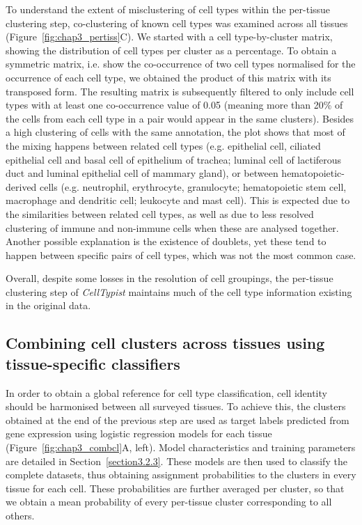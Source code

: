 To understand the extent of misclustering of cell types within the per-tissue clustering step, co-clustering of known cell types was examined across all tissues (Figure~\ref{fig:chap3_pertiss}C). We started with a cell type-by-cluster matrix, showing the distribution of cell types per cluster as a percentage. To obtain a symmetric matrix, i.e. show the co-occurrence of two cell types normalised for the occurrence of each cell type, we obtained the product of this matrix with its transposed form. The resulting matrix is subsequently filtered to only include cell types with at least one co-occurrence value of 0.05 (meaning more than 20\% of the cells from each cell type in a pair would appear in the same clusters). Besides a high clustering of cells with the same annotation, the plot shows that most of the mixing happens between related cell types (e.g. epithelial cell, ciliated epithelial cell and basal cell of epithelium of trachea; luminal cell of lactiferous duct and luminal epithelial cell of mammary gland), or between hematopoietic-derived cells (e.g. neutrophil, erythrocyte, granulocyte; hematopoietic stem cell, macrophage and dendritic cell; leukocyte and mast cell). This is expected due to the similarities between related cell types, as well as due to less resolved clustering of immune and non-immune cells when these are analysed together. Another possible explanation is the existence of doublets, yet these tend to happen between specific pairs of cell types, which was not the most common case.

Overall, despite some losses in the resolution of cell groupings, the per-tissue clustering step of \textit{CellTypist} maintains much of the cell type information existing in the original data.



\subsection{Combining cell clusters across tissues using tissue-specific classifiers}
\label{section3.2.2}
In order to obtain a global reference for cell type classification, cell identity should be harmonised between all surveyed tissues. To achieve this, the clusters obtained at the end of the previous step are used as target labels predicted from gene expression using logistic regression models for each tissue (Figure~\ref{fig:chap3_combcl}A, left). Model characteristics and training parameters are detailed in Section~\ref{section3.2.3}. These models are then used to classify the complete datasets, thus obtaining assignment probabilities to the clusters in every tissue for each cell. These probabilities are further averaged per cluster, so that we obtain a mean probability of every per-tissue cluster corresponding to all others.

